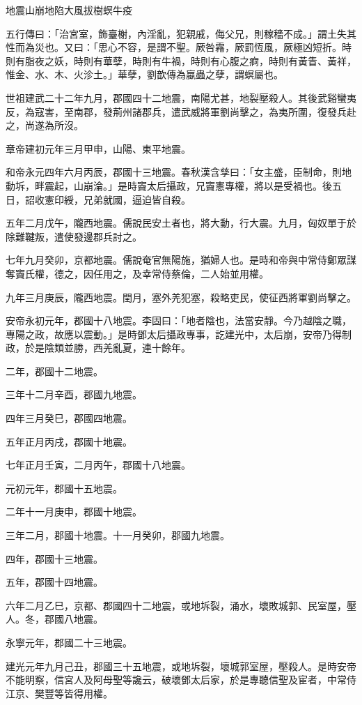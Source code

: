
\begin{pinyinscope}
地震山崩地陷大風拔樹螟牛疫

五行傳曰：「治宮室，飾臺榭，內淫亂，犯親戚，侮父兄，則稼穡不成。」謂土失其性而為災也。又曰：「思心不容，是謂不聖。厥咎霿，厥罰恆風，厥極凶短折。時則有脂夜之妖，時則有華孽，時則有牛禍，時則有心腹之痾，時則有黃眚、黃祥，惟金、水、木、火沴土。」華孽，劉歆傳為蠃蟲之孽，謂螟屬也。

世祖建武二十二年九月，郡國四十二地震，南陽尤甚，地裂壓殺人。其後武谿蠻夷反，為寇害，至南郡，發荊州諸郡兵，遣武威將軍劉尚擊之，為夷所圍，復發兵赴之，尚遂為所沒。

章帝建初元年三月甲申，山陽、東平地震。

和帝永元四年六月丙辰，郡國十三地震。春秋漢含孳曰：「女主盛，臣制命，則地動坼，畔震起，山崩淪。」是時竇太后攝政，兄竇憲專權，將以是受禍也。後五日，詔收憲印綬，兄弟就國，逼迫皆自殺。

五年二月戊午，隴西地震。儒說民安土者也，將大動，行大震。九月，匈奴單于於除難鞬叛，遣使發邊郡兵討之。

七年九月癸卯，京都地震。儒說奄官無陽施，猶婦人也。是時和帝與中常侍鄭眾謀奪竇氏權，德之，因任用之，及幸常侍蔡倫，二人始並用權。

九年三月庚辰，隴西地震。閏月，塞外羌犯塞，殺略吏民，使征西將軍劉尚擊之。

安帝永初元年，郡國十八地震。李固曰：「地者陰也，法當安靜。今乃越陰之職，專陽之政，故應以震動。」是時鄧太后攝政專事，訖建光中，太后崩，安帝乃得制政，於是陰類並勝，西羌亂夏，連十餘年。

二年，郡國十二地震。

三年十二月辛酉，郡國九地震。

四年三月癸巳，郡國四地震。

五年正月丙戌，郡國十地震。

七年正月壬寅，二月丙午，郡國十八地震。

元初元年，郡國十五地震。

二年十一月庚申，郡國十地震。

三年二月，郡國十地震。十一月癸卯，郡國九地震。

四年，郡國十三地震。

五年，郡國十四地震。

六年二月乙巳，京都、郡國四十二地震，或地坼裂，涌水，壞敗城郭、民室屋，壓人。冬，郡國八地震。

永寧元年，郡國二十三地震。

建光元年九月己丑，郡國三十五地震，或地坼裂，壞城郭室屋，壓殺人。是時安帝不能明察，信宮人及阿母聖等讒云，破壞鄧太后家，於是專聽信聖及宦者，中常侍江京、樊豐等皆得用權。


\end{pinyinscope}
